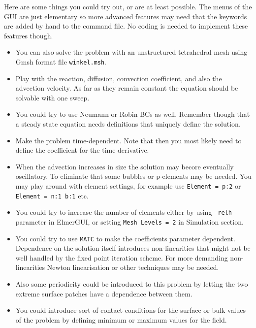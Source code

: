 Here are some things you could try out, or are at least possible. The menus of the GUI are just 
elementary so more advanced features may need that the keywords are added by hand to the 
command file. No coding is needed to implement these features though. 
\begin{itemize}
\item You can also solve the problem with an unstructured tetrahedral mesh using Gmsh format file \texttt{winkel.msh}. 
\item Play with the reaction, diffusion, convection coefficient, and also the advection velocity.
As far as they remain constant the equation should be solvable with one sweep.
\item You could try to use Neumann or Robin BCs as well. Remember though that
a steady state equation needs definitions that uniquely define the solution.
\item Make the problem time-dependent. Note that then you most likely need to define the 
coefficient for the time derivative. 
\item When the advection increases in size the solution may becore eventually oscillatory.
To eliminate that some bubbles or p-elements may be needed. You may play around with 
element settings, for example use \texttt{Element = p:2} or \texttt{Element = n:1 b:1} etc. 
\item You could try to increase the number of elements either by using \texttt{-relh} 
parameter in ElmerGUI, or setting \texttt{Mesh Levels = 2} in Simulation section.
\item You could try to use \texttt{MATC} to make the coefficients parameter dependent.
Dependence on the solution itself introduces non-linearities that might not be well handled 
by the fixed point iteration scheme. For more demanding non-linearities Newton linearisation or
other techniques may be needed. 
\item Also some periodicity could be introduced to this problem by letting the 
two extreme surface patches have a dependence between them.
\item You could introduce sort of contact conditions for the surface or bulk values 
of the problem by defining minimum or maximum values for the field. 
\end{itemize}


\hfill
\mbox{}






